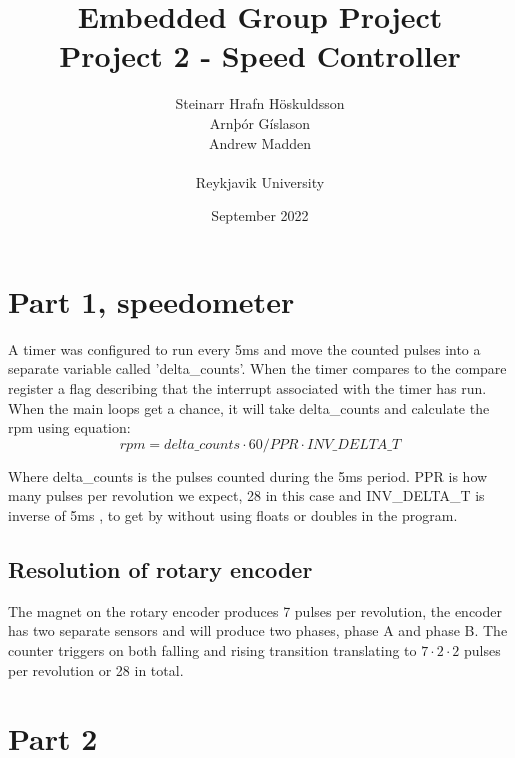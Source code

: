 \documentclass{article}
\title{Embedded Group Project\\ \large Project 2 - Speed Controller}
\author{Steinarr Hrafn Höskuldsson\\
Arnþór Gíslason\\
Andrew Madden\\
\\
Reykjavik University}
\date{September 2022}
\newcommand{\mycomment}[1]{}
\newcommand{\timerinterval}{5ms }
\begin{document}
\maketitle
\mycomment{
\begin{figure}[h]
    \centering
    \texttt{[image: LAB3/Basic1.png]}
    \caption{"Switch test" Breadboard set up}
    \label{fig:Switch_test}
\end{figure}



}

\section{Part 1, speedometer}
A timer was configured to run every \timerinterval and move the counted pulses into a separate variable called 'delta\_counts'. When the timer compares to the compare register a flag describing that the interrupt associated with the timer has run. 
When the main loops get a chance, it will take delta\_counts and calculate the rpm using equation: 
\begin{equation}
     rpm = delta\_counts \cdot 60 / PPR \cdot INV\_DELTA\_T
\end{equation}

Where delta\_counts is the pulses counted during the \timerinterval period. PPR is how many pulses per revolution we expect, 28 in this case and INV\_DELTA\_T is inverse of \timerinterval, to get by without using floats or doubles in the program.

\subsection{Resolution of rotary encoder}
    The magnet on the rotary encoder produces 7 pulses per revolution, the encoder has two separate sensors and will produce two phases, phase A and phase B. The counter triggers on both falling and rising transition translating to $7\cdot2\cdot2$  pulses per revolution or 28 in total. 

\section{Part 2}
\end{document}

